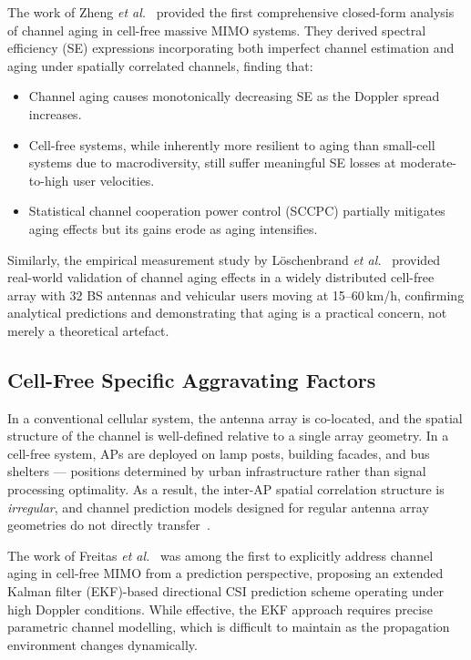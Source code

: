 \documentclass[12pt,a4paper]{article}
\begin{document}
The work of Zheng \textit{et al.}~\cite{Zheng2021impact} provided the
first comprehensive closed-form analysis of channel aging in cell-free
massive MIMO systems. They derived spectral efficiency (SE) expressions
incorporating both imperfect channel estimation and aging under
spatially correlated channels, finding that:
\begin{itemize}[nosep]
  \item Channel aging causes monotonically decreasing SE as the Doppler
        spread increases.
  \item Cell-free systems, while inherently more resilient to aging
        than small-cell systems due to macrodiversity, still suffer
        meaningful SE losses at moderate-to-high user velocities.
  \item Statistical channel cooperation power control (SCCPC) partially
        mitigates aging effects but its gains erode as aging intensifies.
\end{itemize}

Similarly, the empirical measurement study by
L\"{o}schenbrand \textit{et al.}~\cite{Loschenbrand2022measurement}
provided real-world validation of channel aging effects in a widely
distributed cell-free array with 32 BS antennas and vehicular users
moving at 15--60\,km/h, confirming analytical predictions and
demonstrating that aging is a practical concern, not merely a
theoretical artefact.

\subsection{Cell-Free Specific Aggravating Factors}

In a conventional cellular system, the antenna array is co-located,
and the spatial structure of the channel is well-defined relative to a
single array geometry. In a cell-free system, APs are deployed on lamp
posts, building facades, and bus shelters --- positions determined by
urban infrastructure rather than signal processing optimality. As a
result, the inter-AP spatial correlation structure is \textit{irregular},
and channel prediction models designed for regular antenna array
geometries do not directly transfer~\cite{DeFilippo2024cellfree}.

The work of Freitas \textit{et al.}~\cite{Freitas2025ekf} was among
the first to explicitly address channel aging in cell-free MIMO from a
prediction perspective, proposing an extended Kalman filter (EKF)-based
directional CSI prediction scheme operating under high Doppler
conditions. While effective, the EKF approach requires precise
parametric channel modelling, which is difficult to maintain as the
propagation environment changes dynamically.
\end{document}
